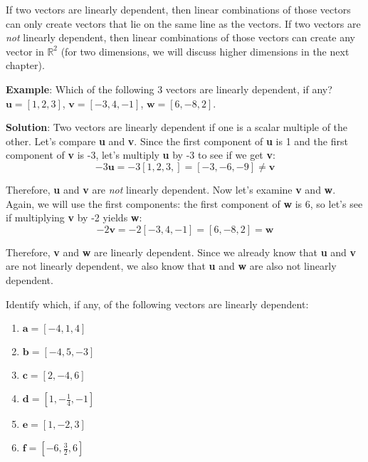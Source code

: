 If two vectors are linearly dependent, then linear combinations of those 
vectors can only create vectors that lie on the same line as the vectors. If 
two vectors are \textit{not} linearly dependent, then linear combinations of 
those vectors can create any vector in $\mathbb{R}^2$ (for two dimensions, we 
will discuss higher dimensions in the next chapter). 

\textbf{Example}: Which of the following 3 vectors are linearly dependent, if 
any? 
$\textbf{u} = \left[1, 2, 3 \right]$, $\textbf{v} = \left[ -3, 4, -1 \right]$, 
$\textbf{w} = \left[ 6, -8, 2 \right]$.

\textbf{Solution}: Two vectors are linearly dependent if one is a scalar 
multiple of the other. Let's compare \textbf{u} and \textbf{v}. Since the 
first component of \textbf{u} is 1 and the first component of \textbf{v} is 
-3, let's multiply \textbf{u} by -3 to see if we get \textbf{v}:
$$-3 \textbf{u} = -3 \left[ 1, 2, 3, \right] = \left[ -3, -6, -9 \right] \neq 
\textbf{v}$$

Therefore, \textbf{u} and \textbf{v} are \textit{not} linearly dependent. Now 
let's examine \textbf{v} and \textbf{w}. Again, we will use the first 
components: the first component of \textbf{w} is 6, so let's see if multiplying 
\textbf{v} by -2 yields \textbf{w}:
$$-2\textbf{v} = -2 \left[ -3, 4, -1 \right] = \left[ 6, -8, 2 \right] = 
\textbf{w}$$

Therefore, \textbf{v} and \textbf{w} are linearly dependent. Since we already 
know that \textbf{u} and \textbf{v} are not linearly dependent, we also know 
that \textbf{u} and \textbf{w} are also not linearly dependent. 

\begin{Exercise}[title = Linear Dependence, label = colinear]
Identify which, if any, of the following vectors are linearly dependent:
\begin{enumerate}
\item $\textbf{a} = \left[ -4, 1, 4 \right]$
\item $\textbf{b} = \left[ -4, 5, -3 \right]$
\item $\textbf{c} = \left[ 2, -4, 6 \right]$
\item $\textbf{d} = \left[ 1, -\frac{1}{4}, -1 \right]$
\item $\textbf{e} = \left[1, -2, 3 \right]$
\item $\textbf{f} = \left[ -6, \frac{3}{2}, 6 \right]$
\end{enumerate}
\end{Exercise}

